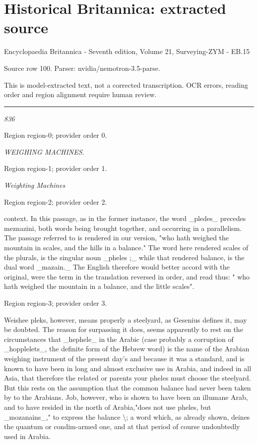 \documentclass[11pt]{article}
\begin{document}
\section*{Historical Britannica: extracted source}
Encyclopaedia Britannica - Seventh edition, Volume 21, Surveying-ZYM - EB.15\par
{\small Source row 100. Parser: nvidia/nemotron-3.5-parse.\par}
{\small This is model-extracted text, not a corrected transcription. OCR errors, reading order and region alignment require human review.\par}
\hrule\medskip
{\small\itshape 836\par}

{\scriptsize\color{gray} Region region-0; provider order 0.\par}
\medskip

{\small\itshape WEIGHING MACHINES.\par}

{\scriptsize\color{gray} Region region-1; provider order 1.\par}
\medskip

{\small\itshape Weighting Machines\par}

{\scriptsize\color{gray} Region region-2; provider order 2.\par}
\medskip

context. In this passage, as in the former instance, the word \_pledes\_ precedes meznazini, both words being brought together, and occurring in a parallelism. The passage referred to is rendered in our version, "who hath weighed the mountain in scales, and the hills in a balance." The word here rendered scales of the plurals, is the singular noun \_pheles ;\_ while that rendered balance, is the dual word \_mazain.\_ The English therefore would better accord with the original, were the term in the translation reversed in order, and read thus: " who hath weighed the mountain in a balance, and the little scales".
\par

{\scriptsize\color{gray} Region region-3; provider order 3.\par}
\medskip

Weishee pleks, however, means properly a steelyard, as Gesenius defines it, may be doubted. The reason for surpassing it does, seems apparently to rest on the circumstances that \_hephele\_ in the Arabic (case probably a corruption of \_hopplelets\_, the definite form of the Hebrew word) is the name of the Arabian weighing instrument of the present day’s and because it was a standard, and is known to have been in long and almost exclusive use in Arabia, and indeed in all Asia, that therefore the related or parents your pheles must choose the steelyard. But this rests on the assumption that the common balance had never been taken by to the Arabians. Job, however, who is shown to have been an illumane Arab, and to have resided in the north of Arabia,"does not use pheles, but \_mozanains\_," to express the balance \textbackslash{}; a word which, as already shown, deines the quantum or condim-armed one, and at that period of course undoubtedly used in Arabia.
\par
\end{document}
